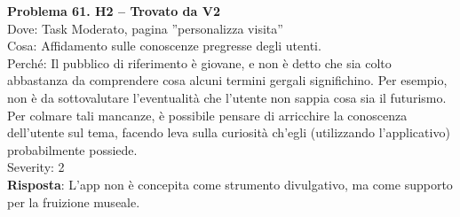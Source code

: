 \documentclass{article}
\begin{document}
\noindent \textbf{Problema 61. H2 – Trovato da V2} \\
Dove: Task Moderato, pagina ”personalizza visita” \\
Cosa: Affidamento sulle conoscenze pregresse degli utenti. \\
Perché: Il pubblico di riferimento è giovane, e non è detto che sia colto abbastanza da comprendere cosa alcuni termini gergali significhino. Per esempio, non è da sottovalutare l’eventualità che l’utente non sappia cosa sia il futurismo. Per colmare tali mancanze, è possibile pensare di arricchire la conoscenza dell’utente sul tema, facendo leva sulla curiosità ch’egli (utilizzando l’applicativo) probabilmente possiede. \\
Severity: 2 \\
\textbf{Risposta}: L’app non è concepita come strumento divulgativo, ma come supporto per la fruizione museale.
\\
\end{document}
